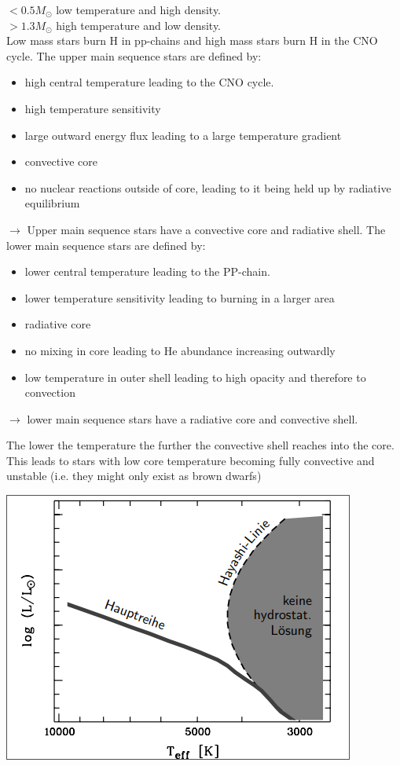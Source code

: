 \documentclass[11pt,a4paper]{article}
\begin{document}
$< 0.5 M_\odot$ low temperature and high density. \\
$> 1.3 M_\odot$ high temperature and low density. \\
Low mass stars burn H in pp-chains and high mass stars burn H in the CNO cycle.
The upper main sequence stars are defined by: 
\begin{itemize}
    \item high central temperature leading to the CNO cycle.
    \item high temperature sensitivity
    \item large outward energy flux leading to a large temperature gradient 
    \item convective core 
    \item no nuclear reactions outside of core, leading to it being held up by radiative equilibrium 
\end{itemize}
$\rightarrow$ Upper main sequence stars have a convective core and radiative shell. 
The lower main sequence stars are defined by: 
\begin{itemize}
    \item lower central temperature leading to the PP-chain.
    \item lower temperature sensitivity leading to burning in a larger area
    \item radiative core 
    \item no mixing in core leading to He abundance increasing outwardly
    \item low temperature in outer shell leading to high opacity and therefore to convection
\end{itemize}
$\rightarrow$ lower main sequence stars have a radiative core and convective shell. 

The lower the temperature the further the convective shell reaches into the core. 
This leads to stars with low core temperature becoming fully convective and unstable (i.e. they might only exist as brown dwarfs)
\begin{center}
    \includegraphics[width=0.5\linewidth]{screenshot_2024-01-23-122838.png}
\end{center}
\end{document}
